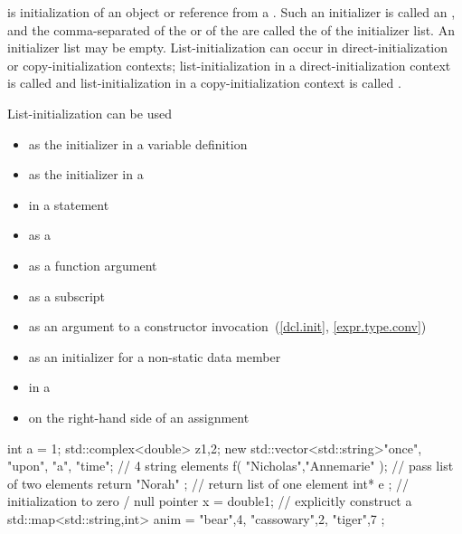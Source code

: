 \pnum
{} is initialization of an object or reference from a
.
Such an initializer is called an , and
the comma-separated
of the 
or
of the 
are called the  of the initializer list. An initializer list may be empty.
List-initialization can occur in direct-initialization or copy-initialization contexts;
list-initialization in a direct-initialization context is called
 and list-initialization in a
copy-initialization context is called .
\begin{note}
List-initialization can be used
\begin{itemize}
\item as the initializer in a variable definition
\item as the initializer in a 
\item in a  statement
\item as a 
\item as a function argument
\item as a subscript
\item as an argument to a constructor invocation~(\ref{dcl.init}, \ref{expr.type.conv})
\item as an initializer for a non-static data member
\item in a 
\item on the right-hand side of an assignment
\end{itemize}

\begin{example}
\begin{codeblock}
int a = {1};
std::complex<double> z{1,2};
new std::vector<std::string>{"once", "upon", "a", "time"};  // 4 string elements
f( {"Nicholas","Annemarie"} );  // pass list of two elements
return { "Norah" };             // return list of one element
int* e {};                      // initialization to zero / null pointer
x = double{1};                  // explicitly construct a 
std::map<std::string,int> anim = { {"bear",4}, {"cassowary",2}, {"tiger",7} };
\end{codeblock}
\end{example}
\end{note}

